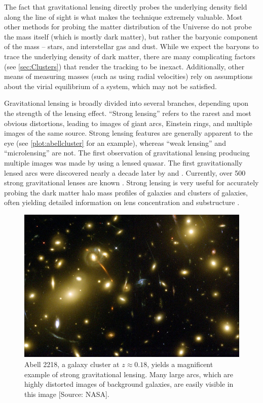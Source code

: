 The fact that gravitational lensing directly probes the underlying density field along the line of sight is what makes the technique extremely valuable. Most other methods for probing the matter distribution of the Universe do not probe the mass itself (which is mostly dark matter), but rather the baryonic component of the mass -- stars, and interstellar gas and dust. While we expect the baryons to trace the underlying density of dark matter, there are many complicating factors (see \autoref{sec:Clusters}) that render the tracking to be inexact. Additionally, other means of measuring masses (such as using radial velocities) rely on assumptions about the virial equilibrium of a system, which may not be satisfied.

Gravitational lensing is broadly divided into several branches, depending upon the strength of the lensing effect. ``Strong lensing'' refers to the rarest and most obvious distortions, leading to images of giant arcs, Einstein rings, and multiple images of the same source. Strong lensing features are generally apparent to the eye (see \autoref{plot:abellcluster} for an example), whereas ``weak lensing'' and ``microlensing'' are not. The first observation of gravitational lensing producing multiple images was made by \citet{Walsh79} using a lensed quasar. The first gravitationally lensed arcs were discovered nearly a decade later by \citet{Lynds86} and \citet{Soucail87,Soucail88}. Currently, over 500 strong gravitational lenses are known \citep{SpaceWarps15}. Strong lensing is very useful for accurately probing the dark matter halo mass profiles of galaxies and clusters of galaxies, often yielding detailed information on lens concentration \citep{Auger10} and substructure \citep{Mao98,Dalal02}. 

\begin{figure}
\begin{center}
\includegraphics[scale=1.5]{plots_intro/Abell2218_Med.jpg}
\caption[Strong Lensing Image]{Abell 2218, a galaxy cluster at $z \approx 0.18$, yields a magnificent example of strong gravitational lensing. Many large arcs, which are highly distorted images of background galaxies, are easily visible in this image [Source: NASA].}
\label{plot:abellcluster}
\end{center}
\end{figure}

